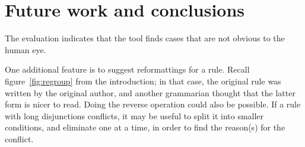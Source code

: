 




\section{Future work and conclusions}
\label{sec:conclusion}

The evaluation indicates that the tool finds cases that are not
obvious to the human eye.

One additional feature is to suggest reformattings for a rule. Recall
figure~\ref{fig:regroup} from the introduction; in that case, the
original rule was written by the original author, and another
grammarian thought that the latter form is nicer to read. Doing the
reverse operation could also be possible. If a rule with long
disjunctions conflicts, it may be useful to split it into smaller
conditions, and eliminate one at a time, in order to find the
reason(s) for the conflict.




